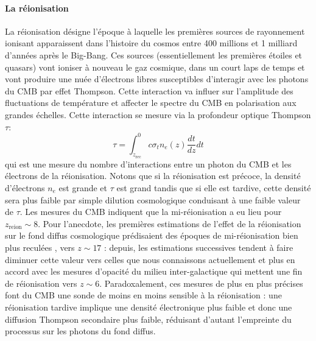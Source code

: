 \paragraph{La réionisation} 
La réionisation désigne l'époque à laquelle les premières sources de rayonnement ionisant apparaissent dans l'histoire du cosmos entre 400 millions et 1 milliard d'années après le Big-Bang. Ces sources (essentiellement les premières étoiles et quasars) vont ioniser à nouveau le gaz cosmique, dans un court laps de temps et vont produire une nuée d'électrons libres susceptibles d'interagir avec les photons du CMB par effet Thompson. Cette interaction va influer sur l'amplitude des fluctuations de température et affecter le spectre du CMB en polarisation aux grandes échelles. Cette interaction se mesure via la profondeur optique Thompson $\tau$:
\begin{equation}
\tau=\int_{z_\mathrm{rec}}^{0} c\sigma_t n_e(z)\frac{dt}{dz}dt
\end{equation}
qui est une mesure du nombre d'interactions entre un photon du CMB et les électrons de la réionisation. Notons que si la réionisation est précoce, la densité d'électrons $n_e$ est grande et $\tau$ est grand tandis que si elle est tardive, cette densité sera plus faible par simple dilution cosmologique conduisant à une faible valeur de $\tau$. Les mesures du CMB indiquent que la mi-réionisation a eu lieu pour $z_\mathrm{reion}\sim8$. Pour l'anecdote, les premières estimations de l'effet de la réionisation sur le fond diffus cosmologique prédisaient des époques de mi-réionisation bien plus reculées , vers $z\sim 17$ : depuis, les estimations successives tendent à faire diminuer cette valeur vers celles que nous connaissons actuellement et plus en accord avec les mesures d'opacité du milieu inter-galactique qui mettent une fin de réionisation vers $z\sim 6$. Paradoxalement, ces mesures de plus en plus précises font du CMB une sonde de moins en moins sensible à la réionisation : une réionisation tardive implique une densité électronique plus faible et donc une diffusion Thompson secondaire plus faible, réduisant d'autant l'empreinte du processus sur les photons du fond diffus.

